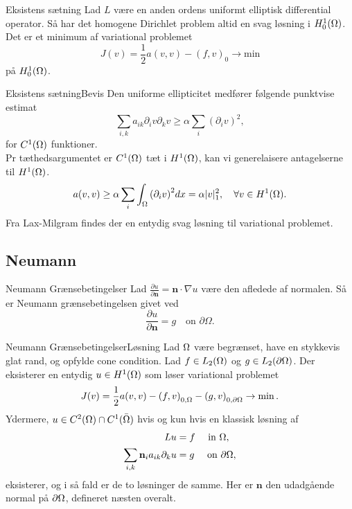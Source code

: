 \begin{frame}{Eksistens sætning}{}
    Lad $L$ være en anden ordens uniformt elliptisk differential operator. Så har det homogene Dirichlet problem altid en svag løsning i $H_0^1(\Omega)$. Det er et minimum af variational problemet
   \begin{equation}
       J(v)=\frac{1}{2} a(v,v) - {(f, v)}_0 \rightarrow \text{min}
   \end{equation}
   på $H_0^1(\Omega)$.
\end{frame}


\begin{frame}{Eksistens sætning}{Bevis}
    Den uniforme ellipticitet medfører følgende punktvise estimat
    \[
        \sum_{i,k} a_{ik} \partial_i v \partial_k v \geq \alpha \sum_i {\left( \partial_i v \right)}^2,
    \]
    for $C^1(\Omega)$ funktioner.\\
    Pr tæthedsargumentet er $C^1(\Omega)$ tæt i $H^1(\Omega)$, kan vi generelaisere antagelserne til $H^1(\Omega)$.
    \begin{equation}
        a(v,v) \geq \alpha \sum_i \int_\Omega {\left(\partial_i v\right)}^2 dx = \alpha |v|^2_1, \quad \forall v \in H^1(\Omega).
    \end{equation}
    Fra Lax-Milgram findes der en entydig svag løsning til variational problemet.
\end{frame}

\subsection{Neumann}
\begin{frame}{Neumann Grænsebetingelser}{}
    Lad $\frac{\partial u}{\partial \mathbf{n}}= \mathbf{n}\cdot \nabla u$ være den afledede af normalen. Så er Neumann grænsebetingelsen givet ved
    \begin{equation}
        \frac{\partial u}{\partial \mathbf{n}}  = g\quad \text{on } \partial \Omega.
    \end{equation}
\end{frame}

\begin{frame}{Neumann Grænsebetingelser}{Løsning}
    Lad $\Omega$ være begrænset, have en stykkevis glat rand, og opfylde cone condition. Lad $f \in L_2(\Omega)$ og $g\in L_2(\partial \Omega)$. Der eksisterer en entydig $u \in H^1(\Omega)$ som løser variational problemet
    \begin{equation*}
     J(v) = \frac{1}{2}a(v,v) - {(f,v)}_{0,\Omega} - {(g,v)}_{0,\partial\Omega} \to \min.
    \end{equation*}
    Ydermere, $u \in C^2(\Omega)\cap C^1(\bar{\Omega})$ hvis og kun hvis en klassisk løsning af
    \begin{align}
     Lu &= f \quad \text{ in }\Omega, \nonumber \\
     \sum_{i,k}  \mathbf{n}_i a_{ik} \partial_k u &= g \quad \text{ on } \partial \Omega, \label{eq:neuman_condition_boundary}
    \end{align}
    eksisterer, og i så fald er de to løsninger de samme. Her er $\mathbf{n}$ den udadgående normal på $\partial \Omega$, defineret næsten overalt.
\end{frame}